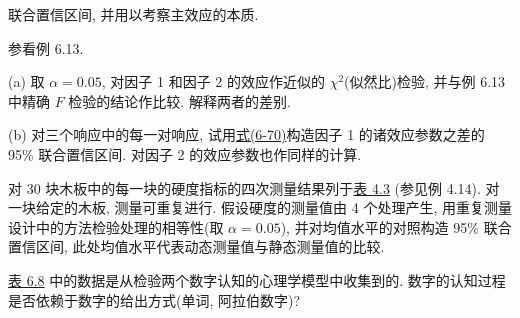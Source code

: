 
联合置信区间, 并用以考察主效应的本质.

\quad 参看例 6.13.

\noindent (a) 取 $\alpha=0.05$, 对因子 1 和因子 2 的效应作近似的 $\chi^2$(似然比)检验, 并与例 6.13 中精确 $F$ 检验的结论作比较. 解释两者的差别.

\noindent (b) 对三个响应中的每一对响应, 试用\hyperref[eq:6-70]{式(6-70)}构造因子 1 的诸效应参数之差的 95\% 联合置信区间. 对因子 2 的效应参数也作同样的计算.

\noindent{}

\quad 对 30 块木板中的每一块的硬度指标的四次测量结果列于\hyperref[tab:4.3]{表 4.3} (参见例 4.14). 对一块给定的木板, 测量可重复进行. 假设硬度的测量值由 4 个处理产生, 用重复测量设计中的方法检验处理的相等性(取 $\alpha=0.05$), 并对均值水平的对照构造 95\% 联合置信区间, 此处均值水平代表动态测量值与静态测量值的比较.

\quad \hyperref[tab:6.8]{表 6.8} 中的数据是从检验两个数字认知的心理学模型中收集到的. 数字的认知过程是否依赖于数字的给出方式(单词, 阿拉伯数字)?

